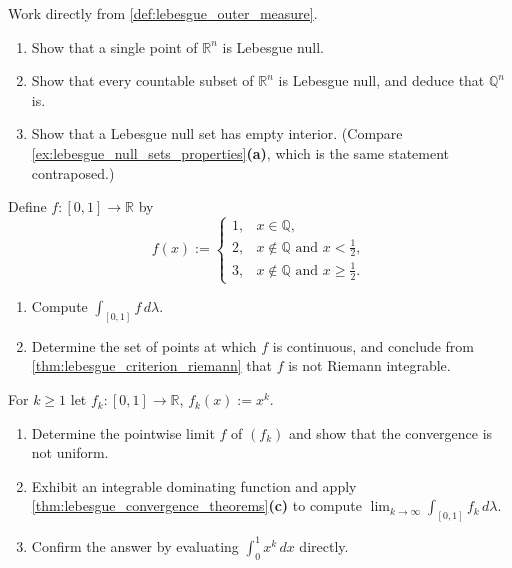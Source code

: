 \begin{aiexercise}
\label{ex:ai_lebesgue_null_countable}
Work directly from \cref{def:lebesgue_outer_measure}.
\begin{enumerate}[label=\textbf{(\alph*)}]
  \item Show that a single point of $\mathbb{R}^n$ is Lebesgue null.
  \item Show that every countable subset of $\mathbb{R}^n$ is Lebesgue null, and deduce that
    $\mathbb{Q}^n$ is.
  \item Show that a Lebesgue null set has empty interior. (Compare
    \cref{ex:lebesgue_null_sets_properties}\textbf{(a)}, which is the same statement contraposed.)
\end{enumerate}
\end{aiexercise}

\begin{aiexercise}
\label{ex:ai_lebesgue_three_valued}
Define $f : [0,1] \to \mathbb{R}$ by
\[f(x) := \begin{cases}
1, & x \in \mathbb{Q}, \\
2, & x \notin \mathbb{Q} \text{ and } x < \tfrac12, \\
3, & x \notin \mathbb{Q} \text{ and } x \ge \tfrac12.
\end{cases}\]
\begin{enumerate}[label=\textbf{(\alph*)}]
  \item Compute $\int_{[0,1]} f \,d\lambda$.
  \item Determine the set of points at which $f$ is continuous, and conclude from
    \cref{thm:lebesgue_criterion_riemann} that $f$ is not Riemann integrable.
\end{enumerate}
\end{aiexercise}

\begin{aiexercise}
\label{ex:ai_dominated_beats_uniform}
For $k \ge 1$ let $f_k : [0,1] \to \mathbb{R}$, $f_k(x) := x^k$.
\begin{enumerate}[label=\textbf{(\alph*)}]
  \item Determine the pointwise limit $f$ of $(f_k)$ and show that the convergence is not uniform.
  \item Exhibit an integrable dominating function and apply
    \cref{thm:lebesgue_convergence_theorems}\textbf{(c)} to compute
    $\lim_{k\to\infty}\int_{[0,1]} f_k\,d\lambda$.
  \item Confirm the answer by evaluating $\int_0^1 x^k\,dx$ directly.
\end{enumerate}
\end{aiexercise}

